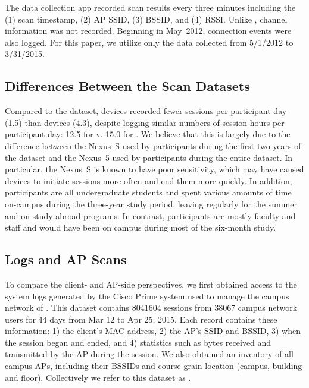 The \NetSense{} data collection app recorded scan results every three
minutes including the (1) scan timestamp, (2) AP SSID, (3) BSSID, and (4) RSSI.
Unlike \ubscan{}, channel information was not recorded.  Beginning in May~2012,
\wifi{} connection events were also logged. For this paper, we utilize only the
data collected from 5/1/2012 to 3/31/2015.

\subsection{Differences Between the Scan Datasets}


Compared to the \ubscan{} dataset, \NetSense{} devices recorded fewer
sessions per participant day (1.5) than \PhoneLab{} devices (4.3), despite
logging similar numbers of session hours per participant day: 12.5 for
\ndscan{} v. 15.0 for \ubscan{}. We believe that this is largely due to the
difference between the Nexus~S used by \NetSense{} participants during the
first two years of the \ndscan{} dataset and the Nexus~5 used by \PhoneLab{}
participants during the entire \ubscan{} dataset. In particular, the Nexus~S
is known to have poor \wifi{} sensitivity, which may have caused \NetSense{}
devices to initiate sessions more often and end them more quickly. In
addition, \NetSense{} participants are all undergraduate students and spent
various amounts of time on-campus during the three-year study period, leaving
regularly for the summer and on study-abroad programs. In contrast,
\PhoneLab{} participants are mostly faculty and staff and would have been on campus
during most of the six-month study.

\subsection{\ub{} \wifi{} Logs and AP Scans}
\label{subsec:cit}

To compare the client- and AP-side perspectives, we first obtained access to the
system logs generated by the Cisco Prime system used to manage
the campus \wifi{} network of \ub{}. This dataset contains \num{8041604} \wifi{}
sessions from \num{38067} \ub{} campus network users for 44 days from Mar 12 to
Apr 25, 2015. Each record contains these information: 1) the client's MAC
address, 2) the AP's SSID and BSSID, 3) when the \wifi{} session began and
ended, and 4) statistics such as bytes received and transmitted by the AP during
the session. We also obtained an inventory of all \ub{} campus APs, including
their BSSIDs and course-grain location (campus, building and floor).
Collectively we refer to this dataset as \textbf{\ubap{}}.

